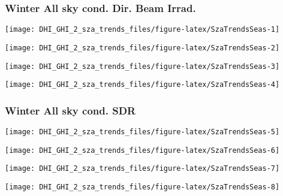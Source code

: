 \documentclass[
  10pt,
  a4paper,oneside]{article}
\begin{document}
\newpage

\hypertarget{winter-all-sky-cond.-dir.-beam-irrad.}{%
\subsubsection{Winter All sky cond. Dir. Beam Irrad.}\label{winter-all-sky-cond.-dir.-beam-irrad.}}

\begin{center}\texttt{[image: DHI\_GHI\_2\_sza\_trends\_files/figure-latex/SzaTrendsSeas-1]} \end{center}

\begin{center}\texttt{[image: DHI\_GHI\_2\_sza\_trends\_files/figure-latex/SzaTrendsSeas-2]} \end{center}

\begin{center}\texttt{[image: DHI\_GHI\_2\_sza\_trends\_files/figure-latex/SzaTrendsSeas-3]} \end{center}

\begin{center}\texttt{[image: DHI\_GHI\_2\_sza\_trends\_files/figure-latex/SzaTrendsSeas-4]} \end{center}

\newpage

\hypertarget{winter-all-sky-cond.-sdr}{%
\subsubsection{Winter All sky cond. SDR}\label{winter-all-sky-cond.-sdr}}

\begin{center}\texttt{[image: DHI\_GHI\_2\_sza\_trends\_files/figure-latex/SzaTrendsSeas-5]} \end{center}

\begin{center}\texttt{[image: DHI\_GHI\_2\_sza\_trends\_files/figure-latex/SzaTrendsSeas-6]} \end{center}

\begin{center}\texttt{[image: DHI\_GHI\_2\_sza\_trends\_files/figure-latex/SzaTrendsSeas-7]} \end{center}

\begin{center}\texttt{[image: DHI\_GHI\_2\_sza\_trends\_files/figure-latex/SzaTrendsSeas-8]} \end{center}
\end{document}
